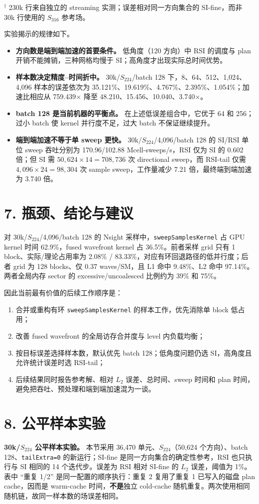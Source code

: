 \documentclass[11pt,a4paper]{article}
\newcommand{\sectiontitle}[1]{\section{\sffamily\color{blue}#1}}
\begin{document}
\footnotesize $^\dagger$ 230k 行来自独立的 streaming 实测；误差相对同一方向集合的 SI-fine，而非 30k 行使用的 $S_{316}$ 参考场。\normalsize

实验揭示的规律如下。
\begin{itemize}
\item \textbf{方向数是端到端加速的首要条件。} 低角度（120 方向）中 RSI 的调度与 plan 开销不能摊销，三种网格均慢于 SI；高角度才出现实际总时间优势。
\item \textbf{样本数决定精度--时间折中。} 30k/$S_{224}$/batch 128 下，8、64、512、1,024、4,096 样本的误差依次为 35.121\%、19.619\%、4.767\%、2.395\%、1.054\%；加速比相应从 759.439$\times$ 降至 48.210、15.456、10.040、3.740$\times$。
\item \textbf{batch 128 是当前机器的平衡点。} 在上述低误差组合中，它优于 64 和 256；过小 batch 使 kernel 并行度不足，过大 batch 不保证继续提升。
\item \textbf{端到端加速不等于单 sweep 更快。} 30k/$S_{224}$/4,096/batch 128 的 SI/RSI 单位 sweep 吞吐分别为 170.96/102.88 Mcell-sweeps/s，RSI 仅为 SI 的 0.602 倍；但 SI 需 $50,624\times14=708,736$ 次 directional sweep，而 RSI-tail 仅需 $4,096\times24=98,304$ 次 sample sweep，工作量减少 7.21 倍，最终端到端加速为 3.740 倍。
\end{itemize}

\sectiontitle{7. 瓶颈、结论与建议}
对 30k/$S_{224}$/4,096/batch 128 的 Nsight 采样中，\texttt{sweepSamplesKernel} 占 GPU kernel 时间 62.9\%，fused wavefront kernel 占 36.5\%。前者采样 grid 只有 1 block、实际/理论占用率为 2.08\% / 83.33\%，对应有环回退路径的低并行度；后者 grid 为 128 blocks、仅 0.37 waves/SM，且 L1 命中 9.48\%、L2 命中 97.14\%。两者全局内存 sector 的 excessive/uncoalesced 比例约为 39\% 和 75\%。

因此当前最有价值的后续工作顺序是：
\begin{enumerate}
\item 合并或重构有环 \texttt{sweepSamplesKernel} 的样本工作，优先消除单 block 低占用；
\item 改善 fused wavefront 的全局访存合并度与 level 内负载均衡；
\item 按目标误差选择样本数，默认优先 batch 128；低角度问题仍选 SI，高角度且允许统计误差时选 RSI-tail；
\item 后续结果同时报告参考解、相对 $L_2$ 误差、总时间、sweep 时间和 plan 时间，避免把吞吐、预处理和端到端加速混为一谈。
\end{enumerate}

\sectiontitle{8. 公平样本实验}
\textbf{30k/$S_{224}$ 公平样本实验。} 本节采用 36,470 单元、$S_{224}$（50,624 个方向）、batch 128、\texttt{tailExtra=0} 的新运行；SI-fine 是同一方向集合的确定性参考，RSI 也只执行与 SI 相同的 14 个迭代步。误差为 RSI 相对 SI-fine 的 $L_2$ 误差，阈值为 1\%。表中 ``重复 1/2'' 是同一配置的顺序执行：重复 2 复用了重复 1 已写入的磁盘 plan cache，因而是 warm-cache 时间，\textbf{不是}独立 cold-cache 随机重复。两次使用相同随机链，故同一样本数的场误差相同。
\end{document}
